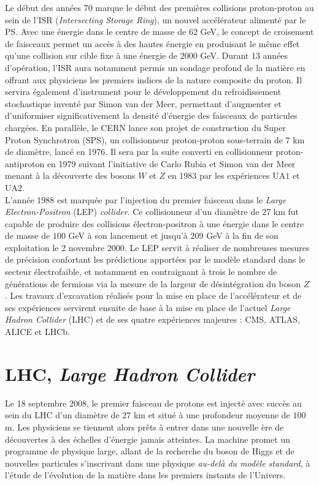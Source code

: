 Le début des années 70 marque le début des premières collisions proton-proton au sein de l'ISR (\textit{Intersecting Storage Ring}), un nouvel accélérateur alimenté par le PS. Avec une énergie dans le centre de masse de $62$ GeV, le concept de croisement de faisceaux permet un accès à des hautes énergie en produisant le même effet qu'une collision sur cible fixe à une énergie de $2000$ GeV. Durant 13 années d'opération, l'ISR aura notamment permis un sondage profond de la matière en offrant aux physiciens les premiers indices de la nature composite du proton. Il servira également d'instrument pour le développement du refroidissement stochastique inventé par Simon van der Meer, permettant d'augmenter et d'uniformiser significativement la densité d'énergie des faisceaux de particules chargées. En parallèle, le CERN lance son projet de construction du Super Proton Synchrotron (SPS), un collisionneur proton-proton sous-terrain de $7$ km de diamètre, lancé en 1976. Il sera par la suite converti en collisionneur proton-antiproton en 1979 suivant l'initiative de Carlo Rubia et Simon van der Meer menant à la découverte des bosons $W$ et $Z$ en 1983 par les expériences UA$1$ et UA$2$. \\

L'année 1988 est marquée par l'injection du premier faisceau dans le \textit{Large Electron-Positron} (LEP) \textit{collider}. Ce collisionneur d'un diamètre de $27$ km fut capable de produire des collisions électron-positron à une énergie dans le centre de masse de $100$ GeV à son lancement et jusqu'à $209$ GeV à la fin de son exploitation le 2 novembre 2000. Le LEP servit à réaliser de nombreuses mesures de précision confortant les prédictions apportées par le modèle standard dans le secteur électrofaible, et notamment en contraignant à trois le nombre de générations de fermions via la mesure de la largeur de désintégration du boson $Z$ \cite{ZALEPH,ZDELPHI,ZL3,ZOPAL}. Les travaux d'excavation réalisés pour la mise en place de l'accélérateur et de ses expériences servirent ensuite de base à la mise en place de l'actuel \textit{Large Hadron Collider} (LHC) et de ses quatre expériences majeures : CMS, ATLAS, ALICE et LHCb. \\

\section{LHC, \textit{\uppercase{L}arge \uppercase{H}adron \uppercase{C}ollider}}

Le 18 septembre 2008, le premier faisceau de protons est injecté avec succès au sein du LHC d'un diamètre de $27$ km et situé à une profondeur moyenne de $100$ m. Les physiciens se tiennent alors prêts à entrer dans une nouvelle ère de découvertes à des échelles d'énergie jamais atteintes. La machine promet un programme de physique large, allant de la recherche du boson de Higgs et de nouvelles particules s'inscrivant dans une physique \textit{au-delà du modèle standard}, à l'étude de l'évolution de la matière dans les premiers instants de l'Univers.

